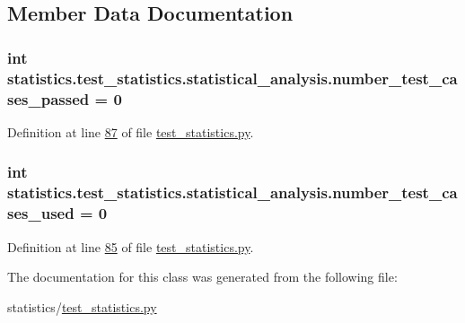 \subsection{Member Data Documentation}
\hypertarget{classstatistics_1_1test__statistics_1_1statistical__analysis_ac7555db570919cec38a8325d8427093e}{}
\subsubsection[{number\+\_\+test\+\_\+cases\+\_\+passed}]{\setlength{\rightskip}{0pt plus 5cm}int statistics.\+test\+\_\+statistics.\+statistical\+\_\+analysis.\+number\+\_\+test\+\_\+cases\+\_\+passed = 0\hspace{0.3cm}{\ttfamily [static]}}\label{classstatistics_1_1test__statistics_1_1statistical__analysis_ac7555db570919cec38a8325d8427093e}


Definition at line \hyperlink{test__statistics_8py_source_l00087}{87} of file \hyperlink{test__statistics_8py_source}{test\+\_\+statistics.\+py}.

\hypertarget{classstatistics_1_1test__statistics_1_1statistical__analysis_afed7a27a010e7377d2719b315d5d5f17}{}
\subsubsection[{number\+\_\+test\+\_\+cases\+\_\+used}]{\setlength{\rightskip}{0pt plus 5cm}int statistics.\+test\+\_\+statistics.\+statistical\+\_\+analysis.\+number\+\_\+test\+\_\+cases\+\_\+used = 0\hspace{0.3cm}{\ttfamily [static]}}\label{classstatistics_1_1test__statistics_1_1statistical__analysis_afed7a27a010e7377d2719b315d5d5f17}


Definition at line \hyperlink{test__statistics_8py_source_l00085}{85} of file \hyperlink{test__statistics_8py_source}{test\+\_\+statistics.\+py}.



The documentation for this class was generated from the following file\+:\begin{DoxyCompactItemize}
\item 
statistics/\hyperlink{test__statistics_8py}{test\+\_\+statistics.\+py}\end{DoxyCompactItemize}
